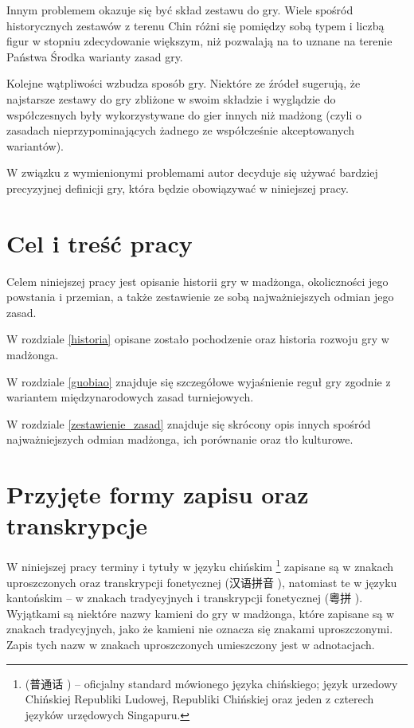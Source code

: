 Innym problemem okazuje się być skład zestawu do gry. Wiele spośród
historycznych zestawów z terenu Chin różni się pomiędzy sobą typem i liczbą
figur w stopniu zdecydowanie większym, niż pozwalają na to uznane na terenie
Państwa Środka warianty zasad gry.

Kolejne wątpliwości wzbudza sposób gry. Niektóre ze źródeł sugerują, że
najstarsze zestawy do gry zbliżone w swoim składzie i wyglądzie do współczesnych
były wykorzystywane do gier innych niż madżong (czyli o zasadach
nieprzypominających żadnego ze współcześnie akceptowanych wariantów).

W związku z wymienionymi problemami autor decyduje się używać bardziej
precyzyjnej definicji gry, %
która będzie obowiązywać w niniejszej pracy.



\section{Cel i treść pracy}
Celem niniejszej pracy jest opisanie historii gry w madżonga, okoliczności jego
powstania i przemian, a także zestawienie ze sobą najważniejszych odmian jego
zasad.

W rozdziale \ref{historia} opisane zostało pochodzenie oraz historia rozwoju gry
w madżonga.

W rozdziale \ref{guobiao} znajduje się szczegółowe wyjaśnienie reguł gry zgodnie
z wariantem międzynarodowych zasad turniejowych.

W rozdziale \ref{zestawienie_zasad} znajduje się skrócony opis innych spośród
najważniejszych odmian madżonga, ich porównanie oraz tło kulturowe.

\section{Przyjęte formy zapisu oraz transkrypcje}
W niniejszej pracy terminy i tytuły w języku chińskim
\footnote{ (普通话 ) --
oficjalny standard mówionego języka chińskiego; język urzedowy Chińskiej Republiki
Ludowej, Republiki Chińskiej oraz jeden z czterech języków urzędowych
Singapuru.} zapisane są w znakach uproszczonych oraz transkrypcji fonetycznej
 (汉语拼音 ), natomiast te w języku
kantońskim -- w znakach tradycyjnych i transkrypcji fonetycznej
 (粵拼 ). Wyjątkami są niektóre nazwy
kamieni do gry w madżonga, które zapisane są w znakach tradycyjnych, jako że
kamieni nie oznacza się znakami uproszczonymi. Zapis tych nazw w znakach
uproszczonych umieszczony jest w adnotacjach.

